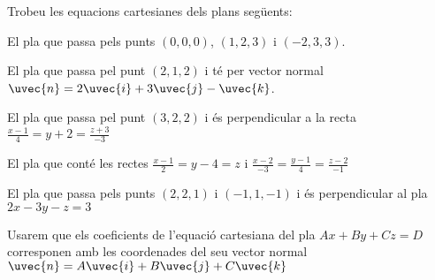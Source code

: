 \Exercise Trobeu les equacions cartesianes dels plans següents:
\begin{llista}
  \item El pla que passa pels punts $(0,0,0)$, $(1,2,3)$ i $(-2,3,3)$.
  \item El pla que passa pel punt $(2,1,2)$ i té per vector normal $\uvec{n}=2\uvec{i}+3\uvec{j}-\uvec{k}$.
  \item El pla que passa pel punt $(3,2,2)$ i és perpendicular a la recta $\frac{x-1}{4}=y+2=\frac{z+3}{-3}$
  \item El pla que conté les rectes $\frac{x-1}{2}=y-4=z$ i $\frac{x-2}{-3}=\frac{y-1}{4}=\frac{z-2}{-1}$
  \item El pla que passa pels punts $(2,2,1)$ i $(-1,1,-1)$ i és perpendicular al pla $2x-3y-z=3$
\end{llista}
 
\Answer Usarem que els coeficients de l'equació cartesiana del pla $Ax+By+Cz=D$ corresponen amb les coordenades del seu vector normal $\uvec{n}=A\uvec{i}+B\uvec{j}+C\uvec{k}$

